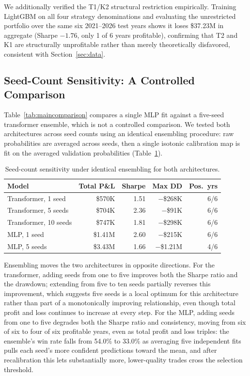 \documentclass[sigconf,review,anonymous]{acmart}
\begin{document}
We additionally verified the T1/K2 structural restriction empirically. Training LightGBM on all four strategy denominations and evaluating the unrestricted portfolio over the same six 2021--2026 test years shows it loses \$37.23M in aggregate (Sharpe $-1.76$, only 1 of 6 years profitable), confirming that T2 and K1 are structurally unprofitable rather than merely theoretically disfavored, consistent with Section~\ref{sec:data}.

\subsection{Seed-Count Sensitivity: A Controlled Comparison}
\label{sec:seedcount}
Table~\ref{tab:maincomparison} compares a single MLP fit against a five-seed transformer ensemble, which is not a controlled comparison. We tested both architectures across seed counts using an identical ensembling procedure: raw probabilities are averaged across seeds, then a single isotonic calibration map is fit on the averaged validation probabilities (Table~\ref{tab:seedcount}).

\begin{table}[H]
\centering
\small
\begin{tabular}{lrrrr}
\toprule
Model & Total P\&L & Sharpe & Max DD & Pos.\ yrs \\
\midrule
Transformer, 1 seed & \$570K & 1.51 & $-$\$268K & 6/6 \\
Transformer, 5 seeds & \$704K & 2.36 & $-$\$91K & 6/6 \\
Transformer, 10 seeds & \$747K & 1.81 & $-$\$298K & 6/6 \\
MLP, 1 seed & \$1.41M & 2.60 & $-$\$215K & 6/6 \\
MLP, 5 seeds & \$3.43M & 1.66 & $-$\$1.21M & 4/6 \\
\bottomrule
\end{tabular}
\caption{Seed-count sensitivity under identical ensembling for both architectures.}
\label{tab:seedcount}
\end{table}

Ensembling moves the two architectures in opposite directions. For the transformer, adding seeds from one to five improves both the Sharpe ratio and the drawdown; extending from five to ten seeds partially reverses this improvement, which suggests five seeds is a local optimum for this architecture rather than part of a monotonically improving relationship, even though total profit and loss continues to increase at every step. For the MLP, adding seeds from one to five degrades both the Sharpe ratio and consistency, moving from six of six to four of six profitable years, even as total profit and loss triples: the ensemble's win rate falls from 54.0\% to 33.0\% as averaging five independent fits pulls each seed's more confident predictions toward the mean, and after recalibration this lets substantially more, lower-quality trades cross the selection threshold.
\end{document}
